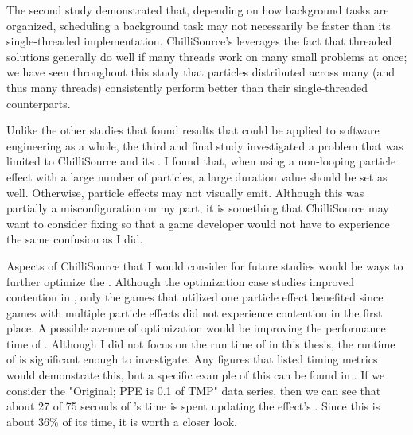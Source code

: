 The second study demonstrated that, depending on how background tasks are organized, scheduling a background task may not necessarily be faster than its single-threaded implementation. ChilliSource's  leverages the fact that threaded solutions generally do well if many threads work on many small problems at once; we have seen throughout this study that particles distributed across many  (and thus many threads) consistently perform better than their single-threaded counterparts.

Unlike the other studies that found results that could be applied to software engineering as a whole, the third and final study investigated a problem that was limited to ChilliSource and its . I found that, when using a non-looping particle effect with a large number of particles, a large duration value should be set as well. Otherwise, particle effects may not visually emit. Although this was partially a misconfiguration on my part, it is something that ChilliSource may want to consider fixing so that a game developer would not have to experience the same confusion as I did.

Aspects of ChilliSource that I would consider for future studies would be ways to further optimize the . Although the optimization case studies improved contention in , only the games that utilized one particle effect benefited since games with multiple particle effects did not experience contention in the first place. A possible avenue of optimization would be improving the performance time of . Although I did not focus on the run time of  in this thesis, the runtime of  is significant enough to investigate. Any figures that listed timing metrics would demonstrate this, but a specific example of this can be found in . If we consider the "Original; PPE is 0.1 of TMP" data series, then we can see that about 27 of 75 seconds of 's time is spent updating the effect's . Since this is about 36\% of its time, it is worth a closer look.



